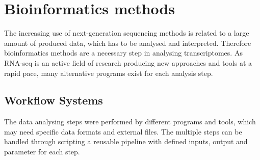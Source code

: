 \documentclass[11pt, a4paper]{report}
\begin{document}
\section{Bioinformatics methods}
The increasing use of next-generation sequencing methods is related to a large amount of produced data, which has to be analysed and interpreted. Therefore bioinformatics methods are a necessary step in analysing transcriptomes. As RNA-seq is an active field of research producing new approaches and tools at a rapid pace, many alternative programs exist for each analysis step. \cite{Korpelainen2014}

\subsection{Workflow Systems}
The data analysing steps were performed by different programs and tools, which may need specific data formats and external files. The multiple steps can be handled through scripting a reusable pipeline with defined inputs, output and parameter for each step. 
\end{document}
